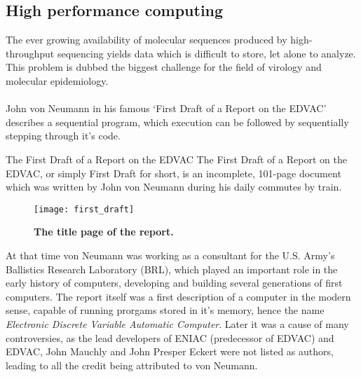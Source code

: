 \subsection{High performance computing}

The ever growing availability of molecular sequences produced by high-throughput sequencing yields data which is difficult to store, let alone to analyze.
This problem is dubbed the biggest challenge for the field of virology and molecular epidemiology. 

\paragraph{}
John von Neumann in his famous `First Draft of a Report on the EDVAC' \cite{vonNeumann1945} describes a sequential program, which execution can be followed by sequentially stepping through it's code.

\begin{remark}{The First Draft of a Report on the EDVAC}
The First Draft of a Report on the EDVAC, or simply First Draft for short, is an incomplete, 101-page document which was written by John von Neumann during his daily commutes by train.
\begin{figure}[H]
\centering
\texttt{[image: first\_draft]}
\caption{
{ \footnotesize 
{\bf The title page of the report.}
} %
}
\label{fig:vonNeumann}
\end{figure}

At that time von Neumann was working as a consultant for the U.S. Army's Ballistics Research Laboratory (BRL), which played an important role in the early history of computers, developing and building several generations of first computers.
The report itself was a first description of a computer in the modern sense, capable of running prorgams stored in it's memory, hence the name \textit{Electronic Discrete Variable Automatic Computer}.
Later it was a cause of many controversies, as the lead developers of ENIAC (predecessor of EDVAC) and EDVAC, John Mauchly and John Presper Eckert were not listed as authors, leading to all the credit being attributed to von Neumann.
\end{remark}


